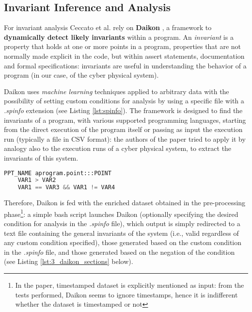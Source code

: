 \subsection{Invariant Inference and Analysis}
\label{subsec:3_ceccato_invariants}
For invariant analysis Ceccato et al. rely on \textbf{Daikon} \cite{daikon_site}, a framework to \textbf{dynamically detect likely invariants} within a program. An \textit{invariant} is a property that holds at one or more points in a program, properties that are not normally made explicit in the code, but within assert statements, documentation and formal specifications: invariants are useful in understanding the behavior of a program (in our case, of the cyber physical system).

Daikon uses \textit{machine learning} techniques applied to arbitrary data with the possibility of setting custom conditions for analysis by using a specific file \cite{daikon_spinfo} with a \textit{.spinfo} extension (see Listing \ref{lst:spinfo}). The framework is designed to find the invariants of a program, with various supported programming languages, starting from the direct execution of the program itself or passing as input the execution run (typically a file in CSV format): the authors of the paper tried to apply it by analogy also to the execution runs of a cyber physical system, to extract the invariants of this system.

\begin{lstlisting}[language=Python,numbers=none,caption={Generic example of a .spinfo file for customizing rules in Daikon},label=lst:spinfo]
	PPT_NAME aprogram.point:::POINT
	VAR1 > VAR2
	VAR1 == VAR3 && VAR1 != VAR4
\end{lstlisting}

Therefore, Daikon is fed with the enriched dataset obtained in the pre-processing phase\footnote{In the paper, timestamped dataset is explicitly mentioned as input: from the tests performed, Daikon seems to ignore timestamps, hence it is indifferent whether the dataset is timestamped or not}: a simple bash script launches Daikon (optionally specifying the desired condition for analysis in the \textit{.spinfo} file), which output is simply redirected to a text file containing the general invariants of the system (i.e., valid regardless of any custom condition specified), those generated based on the custom condition in the \textit{.spinfo} file, and those generated based on the negation of the condition (see Listing \ref{lst:3_daikon_sections} below).

